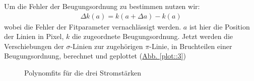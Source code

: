        Um die Fehler der Beugungsordnung zu bestimmen nutzen wir:
        \begin{align}
          \Delta k(a) = k(a+\Delta a) - k(a)
        \end{align}
        wobei die Fehler der Fitparameter vernachlässigt werden. $a$ ist hier die Position der Linien in Pixel, $k$ die zugeordnete Beugungsordnung. Jetzt werden die Verschiebungen der $\sigma$-Linien zur zugehörigen $\pi$-Linie, in Bruchteilen einer Beugungsordnung, berechnet und geplottet (\hyperref[plot::3]{Abb. \ref*{plot::3}})

        \begin{landscape}
          \thispagestyle{empty}
          \begin{figure}
            \vspace*{-2cm}
            \caption{Polynomfits für die drei Stromstärken}
            \hspace*{-5cm}

\end{figure}
\end{landscape}
